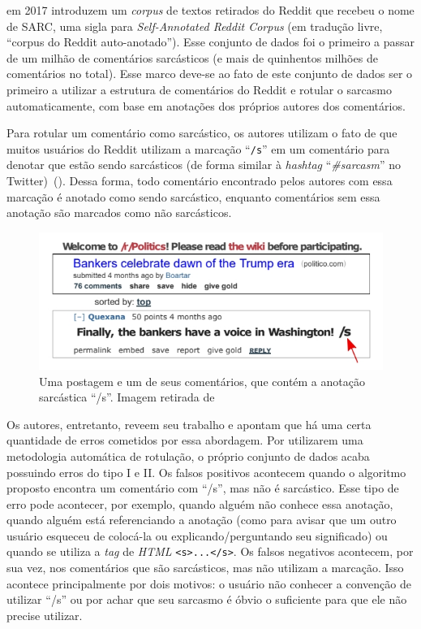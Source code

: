 \cite{khodak-etal:2017:sarc} em 2017 introduzem um \textit{corpus} de textos
retirados do Reddit que recebeu o nome de SARC, uma sigla para
\textit{Self-Annotated Reddit Corpus} (em tradução livre, ``corpus do Reddit
auto-anotado''). Esse conjunto de dados foi o primeiro a passar de um milhão de
comentários sarcásticos (e mais de quinhentos milhões de comentários no total).
Esse marco deve-se ao fato de este conjunto de dados ser o primeiro a utilizar a
estrutura de comentários do Reddit e rotular o sarcasmo automaticamente, com
base em anotações dos próprios autores dos comentários.

Para rotular um comentário como sarcástico, os autores utilizam o fato de que
muitos usuários do Reddit utilizam a marcação ``\texttt{/s}'' em um comentário
para denotar que estão sendo sarcásticos (de forma similar à \textit{hashtag}
``\textit{\#sarcasm}'' no Twitter)~(\cite{what-does-s-mean}). Dessa forma, todo
comentário encontrado pelos autores com essa marcação é anotado como sendo
sarcástico, enquanto comentários sem essa anotação são marcados como não
sarcásticos.

\begin{figure}[h]
\centering
\includegraphics[scale=0.7]{Res/sarc-img1.jpg}
\caption{Uma postagem e um de seus comentários, que contém a anotação sarcástica
``/s''. Imagem retirada de \cite{khodak-etal:2017:sarc}}
\label{sarc-img1.jpg}
\end{figure}

Os autores, entretanto, reveem seu trabalho e apontam que há uma certa
quantidade de erros cometidos por essa abordagem. Por utilizarem uma metodologia
automática de rotulação, o próprio conjunto de dados acaba possuindo erros do
tipo I e II. Os falsos positivos acontecem quando o algoritmo proposto encontra
um comentário com ``/s'', mas não é sarcástico. Esse tipo de erro pode
acontecer, por exemplo, quando alguém não conhece essa anotação, quando alguém
está referenciando a anotação (como para avisar que um outro usuário esqueceu de
colocá-la ou explicando/perguntando seu significado) ou quando se utiliza a
\textit{tag} de \textit{HTML} \texttt{<s>...</s>}. Os falsos negativos
acontecem, por sua vez, nos comentários que são sarcásticos, mas não utilizam a
marcação. Isso acontece principalmente por dois motivos: o usuário não conhecer
a convenção de utilizar ``/s'' ou por achar que seu sarcasmo é óbvio o
suficiente para que ele não precise utilizar.

